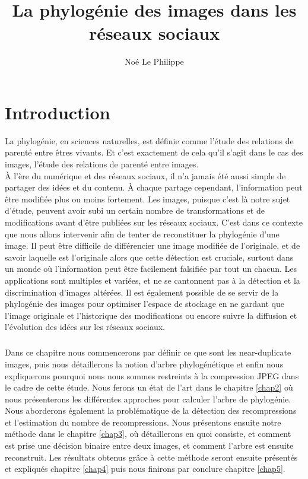 \documentclass[utf8,final]{stageM2R} %
\author{Noé Le Philippe}
\title{La phylogénie des images dans les réseaux sociaux}
\begin{document}
   
\frontmatter  %
\maketitle    %
\cleardoublepage   
\tableofcontents %
\mainmatter  %



\chapter{Introduction}
La phylogénie, en sciences naturelles, est définie comme l'étude des relations de parenté entre êtres vivants. Et c'est exactement de cela qu'il s'agit dans le cas des images, l'étude des relations de parenté entre images. \autocite{phylogeny} \\
À l'ère du numérique et des réseaux sociaux, il n'a jamais été aussi simple de partager des idées et du contenu. À chaque partage cependant, l'information peut être modifiée plus ou moins fortement. Les images, puisque c'est là notre sujet d'étude, peuvent avoir subi un certain nombre de transformations et de modifications avant d'être publiées sur les réseaux sociaux. C'est dans ce contexte que nous allons intervenir afin de tenter de reconstituer la phylogénie d'une image. Il peut être difficile de différencier une image modifiée de l'originale, et de savoir laquelle est l'originale alors que cette détection est cruciale, surtout dans un monde où l'information peut être facilement falsifiée par tout un chacun. Les applications sont multiples et variées, et ne se cantonnent pas à la détection et la discrimination d'images altérées. Il est également possible de se servir de la phylogénie des images pour optimiser l'espace de stockage en ne gardant que l'image originale et l'historique des modifications ou encore suivre la diffusion et l'évolution des idées sur les réseaux sociaux. 
\paragraph{}

Dans ce chapitre nous commencerons par définir ce que sont les near-duplicate images, puis nous détaillerons la notion d'arbre phylogénétique et enfin nous expliquerons pourquoi nous nous sommes restreints à la compression JPEG dans le cadre de cette étude. Nous ferons un état de l'art dans le chapitre \ref{chap2} où nous présenterons les différentes approches pour calculer l'arbre de phylogénie. Nous aborderons également la problématique de la détection des recompressions et l'estimation du nombre de recompressions. Nous présentons ensuite notre méthode dans le chapitre \ref{chap3}, où détaillerons en quoi consiste, et comment est prise une décision binaire entre deux images, et comment l'arbre est ensuite reconstruit. Les résultats obtenus grâce à cette méthode seront ensuite présentés et expliqués chapitre \ref{chap4} puis nous finirons par conclure chapitre \ref{chap5}.
\end{document}

